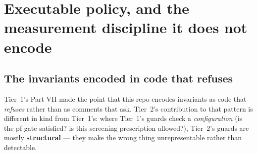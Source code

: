 %

\section{Executable policy, and the measurement discipline it does not encode}
\label{part:policy}

\subsection{The invariants encoded in code that refuses}
\label{sec:refuses}

Tier~1's Part VII made the point that this repo encodes invariants as code that
\emph{refuses} rather than as comments that ask. Tier~2's contribution to that
pattern is different in kind from Tier~1's: where Tier~1's guards check a
\emph{configuration} (is the pf gate satisfied? is this screening prescription
allowed?), Tier~2's guards are mostly \textbf{structural} --- they make the
wrong thing unrepresentable rather than detectable.

